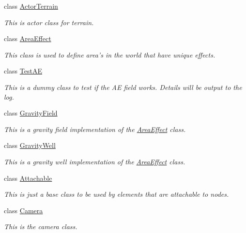 \begin{DoxyCompactItemize}
class \hyperlink{classphys_1_1ActorTerrain}{ActorTerrain}
\begin{DoxyCompactList}\small\item\em This is actor class for terrain. \item\end{DoxyCompactList}\item 
class \hyperlink{classphys_1_1AreaEffect}{AreaEffect}
\begin{DoxyCompactList}\small\item\em This class is used to define area's in the world that have unique effects. \item\end{DoxyCompactList}\item 
class \hyperlink{classphys_1_1TestAE}{TestAE}
\begin{DoxyCompactList}\small\item\em This is a dummy class to test if the AE field works. Details will be output to the log. \item\end{DoxyCompactList}\item 
class \hyperlink{classphys_1_1GravityField}{GravityField}
\begin{DoxyCompactList}\small\item\em This is a gravity field implementation of the \hyperlink{classphys_1_1AreaEffect}{AreaEffect} class. \item\end{DoxyCompactList}\item 
class \hyperlink{classphys_1_1GravityWell}{GravityWell}
\begin{DoxyCompactList}\small\item\em This is a gravity well implementation of the \hyperlink{classphys_1_1AreaEffect}{AreaEffect} class. \item\end{DoxyCompactList}\item 
class \hyperlink{classphys_1_1Attachable}{Attachable}
\begin{DoxyCompactList}\small\item\em This is just a base class to be used by elements that are attachable to nodes. \item\end{DoxyCompactList}\item 
class \hyperlink{classphys_1_1Camera}{Camera}
\begin{DoxyCompactList}\small\item\em This is the camera class. \item\end{DoxyCompactList}\item 

\end{DoxyCompactItemize}
